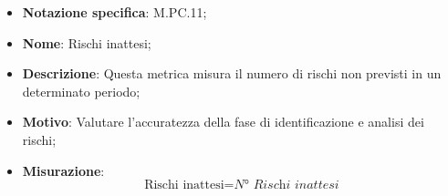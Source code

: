
\begin{itemize}
    \item \textbf{Notazione specifica}: M.PC.11;
    \item \textbf{Nome}: Rischi inattesi;
    \item \textbf{Descrizione}: Questa metrica misura il numero di rischi non previsti in un determinato periodo;
    \item \textbf{Motivo}: Valutare l'accuratezza della fase di identificazione e analisi dei rischi;
    \item \textbf{Misurazione}:
    \[
        \text{Rischi inattesi} = \textit{N° Rischi inattesi}
    \]
\end{itemize}
